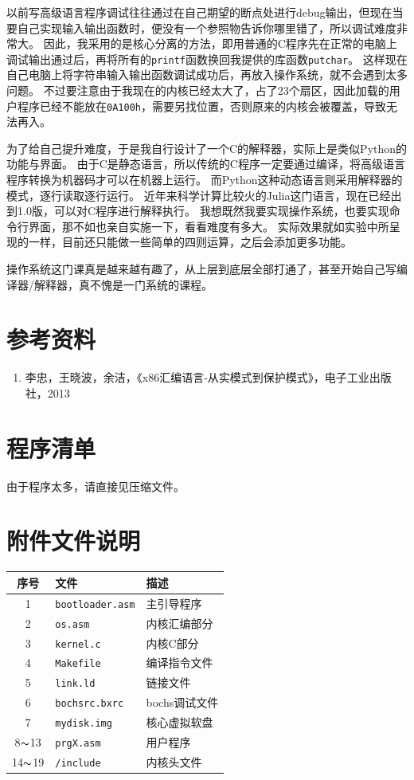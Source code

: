 \documentclass[logo,reportComp]{thesis}
\begin{document}
以前写高级语言程序调试往往通过在自己期望的断点处进行debug输出，但现在当要自己实现输入输出函数时，便没有一个参照物告诉你哪里错了，所以调试难度非常大。
因此，我采用的是核心分离的方法，即用普通的C程序先在正常的电脑上调试输出通过后，再将所有的\verb'printf'函数换回我提供的库函数\verb'putchar'。
这样现在自己电脑上将字符串输入输出函数调试成功后，再放入操作系统，就不会遇到太多问题。
不过要注意由于我现在的内核已经太大了，占了23个扇区，因此加载的用户程序已经不能放在\verb'0A100h'，需要另找位置，否则原来的内核会被覆盖，导致无法再入。

为了给自己提升难度，于是我自行设计了一个C的解释器，实际上是类似Python的功能与界面。
由于C是静态语言，所以传统的C程序一定要通过编译，将高级语言程序转换为机器码才可以在机器上运行。
而Python这种动态语言则采用解释器的模式，逐行读取逐行运行。
近年来科学计算比较火的Julia这门语言，现在已经出到1.0版，可以对C程序进行解释执行。
我想既然我要实现操作系统，也要实现命令行界面，那不如也亲自实施一下，看看难度有多大。
实际效果就如实验中所呈现的一样，目前还只能做一些简单的四则运算，之后会添加更多功能。

操作系统这门课真是越来越有趣了，从上层到底层全部打通了，甚至开始自己写编译器/解释器，真不愧是一门系统的课程。

\section{参考资料}
\begin{enumerate}
	\item 李忠，王晓波，余洁，《x86汇编语言-从实模式到保护模式》，电子工业出版社，2013
\end{enumerate}

\appendix
\appendixconfig
\section{程序清单}
\label{sec:code}
由于程序太多，请直接见压缩文件。

\section{附件文件说明}
\begin{center}
\begin{tabular}{|c|l|l|}\hline
序号 & 文件 & 描述 \\\hline
1 & \verb'bootloader.asm' & 主引导程序\\\hline
2 & \verb'os.asm' & 内核汇编部分\\\hline
3 & \verb'kernel.c' & 内核C部分\\\hline
4 & \verb'Makefile' & 编译指令文件\\\hline
5 & \verb'link.ld' & 链接文件\\\hline
6 & \verb'bochsrc.bxrc' & bochs调试文件\\\hline
7 & \verb'mydisk.img' & 核心虚拟软盘\\\hline
8$\thicksim$13 & \verb'prgX.asm' & 用户程序\\\hline
14$\thicksim$19 & \verb'/include' & 内核头文件\\\hline
\end{tabular}
\end{center}
\end{document}

